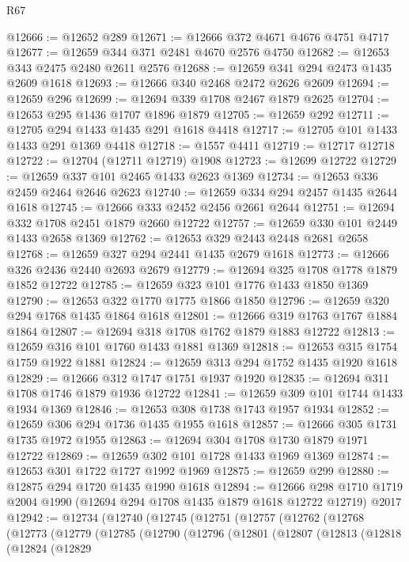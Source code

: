 \begin{lexlean}{R67}
\begin{coremodule}
@12666 := @12652 @289
@12671 := @12666 @372 @4671 @4676 @4751 @4717
@12677 := @12659 @344 @371 @2481 @4670 @2576 @4750
@12682 := @12653 @343 @2475 @2480 @2611 @2576
@12688 := @12659 @341 @294 @2473 @1435 @2609 @1618
@12693 := @12666 @340 @2468 @2472 @2626 @2609
@12694 := @12659 @296
@12699 := @12694 @339 @1708 @2467 @1879 @2625
@12704 := @12653 @295 @1436 @1707 @1896 @1879
@12705 := @12659 @292
@12711 := @12705 @294 @1433 @1435 @291 @1618 @4418
@12717 := @12705 @101 @1433 @1433 @291 @1369 @4418
@12718 := @1557 @4411
@12719 := @12717 @12718
@12722 := @12704 (@12711 @12719) @1908
@12723 := @12699 @12722
@12729 := @12659 @337 @101 @2465 @1433 @2623 @1369
@12734 := @12653 @336 @2459 @2464 @2646 @2623
@12740 := @12659 @334 @294 @2457 @1435 @2644 @1618
@12745 := @12666 @333 @2452 @2456 @2661 @2644
@12751 := @12694 @332 @1708 @2451 @1879 @2660 @12722
@12757 := @12659 @330 @101 @2449 @1433 @2658 @1369
@12762 := @12653 @329 @2443 @2448 @2681 @2658
@12768 := @12659 @327 @294 @2441 @1435 @2679 @1618
@12773 := @12666 @326 @2436 @2440 @2693 @2679
@12779 := @12694 @325 @1708 @1778 @1879 @1852 @12722
@12785 := @12659 @323 @101 @1776 @1433 @1850 @1369
@12790 := @12653 @322 @1770 @1775 @1866 @1850
@12796 := @12659 @320 @294 @1768 @1435 @1864 @1618
@12801 := @12666 @319 @1763 @1767 @1884 @1864
@12807 := @12694 @318 @1708 @1762 @1879 @1883 @12722
@12813 := @12659 @316 @101 @1760 @1433 @1881 @1369
@12818 := @12653 @315 @1754 @1759 @1922 @1881
@12824 := @12659 @313 @294 @1752 @1435 @1920 @1618
@12829 := @12666 @312 @1747 @1751 @1937 @1920
@12835 := @12694 @311 @1708 @1746 @1879 @1936 @12722
@12841 := @12659 @309 @101 @1744 @1433 @1934 @1369
@12846 := @12653 @308 @1738 @1743 @1957 @1934
@12852 := @12659 @306 @294 @1736 @1435 @1955 @1618
@12857 := @12666 @305 @1731 @1735 @1972 @1955
@12863 := @12694 @304 @1708 @1730 @1879 @1971 @12722
@12869 := @12659 @302 @101 @1728 @1433 @1969 @1369
@12874 := @12653 @301 @1722 @1727 @1992 @1969
@12875 := @12659 @299
@12880 := @12875 @294 @1720 @1435 @1990 @1618
@12894 := @12666
    @298
    @1710
    @1719
    @2004
    @1990
    (@12694 @294 @1708 @1435 @1879 @1618 @12722 @12719)
    @2017
@12942 := @12734
    (@12740
      (@12745
        (@12751
          (@12757
            (@12762
              (@12768
                (@12773
                  (@12779
                    (@12785
                      (@12790
                        (@12796
                          (@12801
                            (@12807
                              (@12813
                                (@12818
                                  (@12824
                                    (@12829

\end{coremodule}
\end{lexlean}
